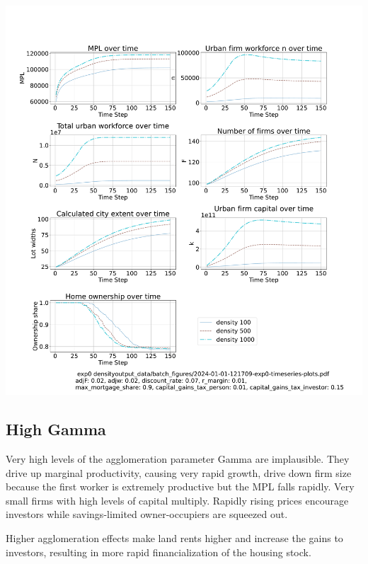  \hspace*{-2cm}\includegraphics[trim= 1.5cm 3.65cm 2cm 4.0cm, clip, scale=.3]{fig/Analysis/Density-3-150.pdf}

\newpage %

\subsection{High Gamma}
Very high levels of the agglomeration parameter Gamma are implausible. They drive up marginal productivity, causing very rapid growth, drive down firm size because the first worker is extremely productive but the MPL falls rapidly. Very small firms with high levels of capital multiply. Rapidly rising prices encourage investors while savings-limited owner-occupiers are squeezed out.

Higher agglomeration effects make land rents higher and increase the gains to investors, resulting in more rapid financialization of the housing stock.

 

